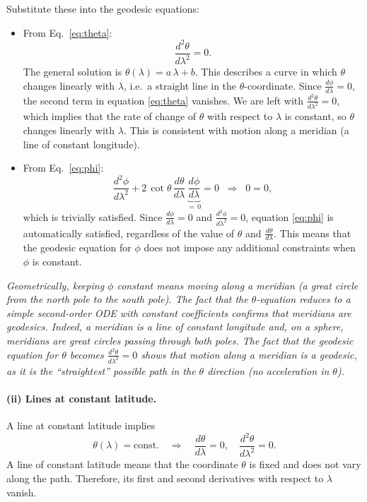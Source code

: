 \documentclass{article}
\begin{document}
Substitute these into the geodesic equations:
\begin{itemize}
\item From Eq.~\eqref{eq:theta}:
\[
\frac{d^2 \theta}{d\lambda^2} = 0.
\]
The general solution is \(\theta(\lambda) = a\,\lambda + b\). This describes a curve in which \(\theta\) changes linearly with \(\lambda\), i.e.\ a straight line in the \(\theta\)-coordinate. Since \(\tfrac{d\phi}{d\lambda} = 0\), the second term in equation \eqref{eq:theta} vanishes. We are left with \(\tfrac{d^2 \theta}{d\lambda^2} = 0\), which implies that the rate of change of \(\theta\) with respect to \(\lambda\) is constant, so \(\theta\) changes linearly with \(\lambda\). This is consistent with motion along a meridian (a line of constant longitude).

\item From Eq.~\eqref{eq:phi}:
\[
\frac{d^2 \phi}{d\lambda^2}
+ 2 \,\cot\theta\,\frac{d\theta}{d\lambda}\,\underbrace{\frac{d\phi}{d\lambda}}_{=\,0}
= 0
\;\;\Longrightarrow\;\;
0 = 0,
\]
which is trivially satisfied. Since \(\tfrac{d\phi}{d\lambda} = 0\) and \(\tfrac{d^2\phi}{d\lambda^2} = 0\), equation \eqref{eq:phi} is automatically satisfied, regardless of the value of \(\theta\) and \(\tfrac{d\theta}{d\lambda}\). This means that the geodesic equation for \(\phi\) does not impose any additional constraints when \(\phi\) is constant.
\end{itemize}

\emph{Geometrically, keeping \(\phi\) constant means moving along a meridian (a great circle from the north pole to the south pole). The fact that the \(\theta\)-equation reduces to a simple second-order ODE with constant coefficients confirms that meridians are geodesics. Indeed, a meridian is a line of constant longitude and, on a sphere, meridians are great circles passing through both poles. The fact that the geodesic equation for \(\theta\) becomes \(\tfrac{d^2 \theta}{d\lambda^2} = 0\) shows that motion along a meridian is a geodesic, as it is the ``straightest'' possible path in the \(\theta\) direction (no acceleration in \(\theta\)).}

\paragraph{(ii) Lines at constant latitude.}
A line at constant latitude implies
\[
\theta(\lambda) = \text{const.}
\quad\Longrightarrow\quad
\frac{d\theta}{d\lambda} = 0, \quad
\frac{d^2\theta}{d\lambda^2} = 0.
\]
A line of constant latitude means that the coordinate \(\theta\) is fixed and does not vary along the path. Therefore, its first and second derivatives with respect to \(\lambda\) vanish.
\end{document}
